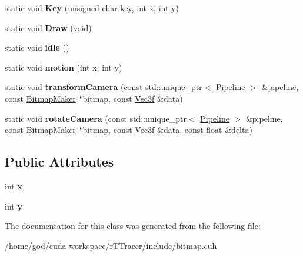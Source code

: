 \begin{DoxyCompactItemize}
\item 
static void {\bfseries Key} (unsigned char key, int x, int y)\hypertarget{class_bitmap_maker_a5419c10622f3287678904cfe33bded58}{}\label{class_bitmap_maker_a5419c10622f3287678904cfe33bded58}

\item 
static void {\bfseries Draw} (void)\hypertarget{class_bitmap_maker_a7fbe404cf3772e9f00af0f80b8afa781}{}\label{class_bitmap_maker_a7fbe404cf3772e9f00af0f80b8afa781}

\item 
static void {\bfseries idle} ()\hypertarget{class_bitmap_maker_a0103e8746802fc4f2af3ce16a9a11613}{}\label{class_bitmap_maker_a0103e8746802fc4f2af3ce16a9a11613}

\item 
static void {\bfseries motion} (int x, int y)\hypertarget{class_bitmap_maker_af7d3a02f076e5ac261fc12ab66be9519}{}\label{class_bitmap_maker_af7d3a02f076e5ac261fc12ab66be9519}

\item 
static void {\bfseries transform\+Camera} (const std\+::unique\+\_\+ptr$<$ \hyperlink{class_pipeline}{Pipeline} $>$ \&pipeline, const \hyperlink{class_bitmap_maker}{Bitmap\+Maker} $\ast$bitmap, const \hyperlink{class_vec3}{Vec3f} \&data)\hypertarget{class_bitmap_maker_a8ea46e4e115677c1b5b52decb1e516a9}{}\label{class_bitmap_maker_a8ea46e4e115677c1b5b52decb1e516a9}

\item 
static void {\bfseries rotate\+Camera} (const std\+::unique\+\_\+ptr$<$ \hyperlink{class_pipeline}{Pipeline} $>$ \&pipeline, const \hyperlink{class_bitmap_maker}{Bitmap\+Maker} $\ast$bitmap, const \hyperlink{class_vec3}{Vec3f} \&data, const float \&delta)\hypertarget{class_bitmap_maker_a0bcc8f4a244f10901f4326ff020bb5a4}{}\label{class_bitmap_maker_a0bcc8f4a244f10901f4326ff020bb5a4}

\end{DoxyCompactItemize}
\subsection*{Public Attributes}
\begin{DoxyCompactItemize}
\item 
int {\bfseries x}\hypertarget{class_bitmap_maker_a45b158013c295196bdaa491f6acd2a5c}{}\label{class_bitmap_maker_a45b158013c295196bdaa491f6acd2a5c}

\item 
int {\bfseries y}\hypertarget{class_bitmap_maker_af790b4055fcc02c12abdc6c19563f737}{}\label{class_bitmap_maker_af790b4055fcc02c12abdc6c19563f737}

\end{DoxyCompactItemize}


The documentation for this class was generated from the following file\+:\begin{DoxyCompactItemize}
\item 
/home/god/cuda-\/workspace/r\+T\+Tracer/include/bitmap.\+cuh\end{DoxyCompactItemize}
